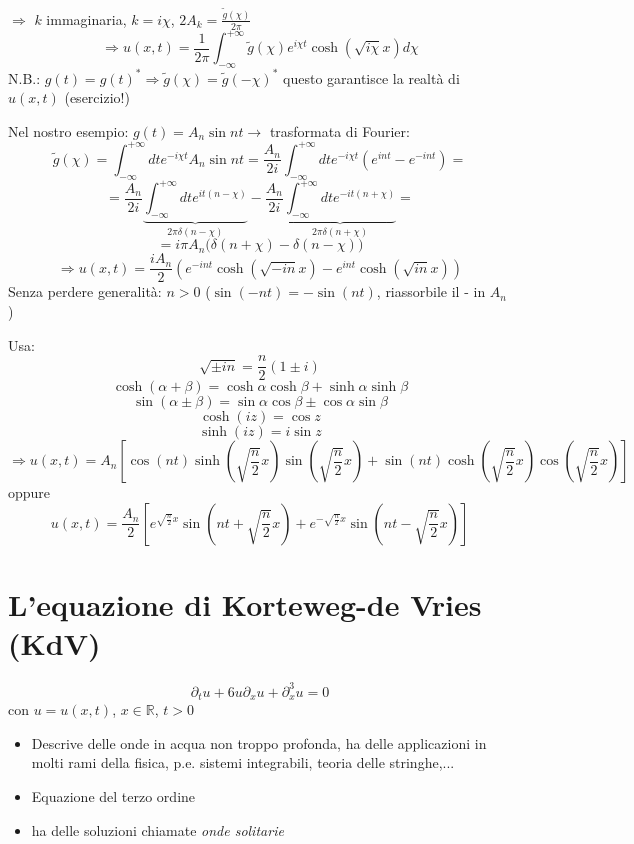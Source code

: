 \documentclass[a4paper,11pt]{report}
\newcommand{\R}{\mathbb{R}}
\begin{document}
$\Rightarrow$ $k$ immaginaria, $k=i\chi$, $2A_k = \frac{\tilde{g}(\chi)}{2\pi}$
\[
\Rightarrow u(x,t) =\frac{1}{2\pi}\int_{-\infty}^{+\infty}\tilde{g}(\chi)e^{i\chi t}\cosh(\sqrt{i\chi}x) d\chi
\]
N.B.: $g(t)=g(t)^* \Rightarrow \tilde{g}(\chi)=\tilde{g}(-\chi)^*$ questo garantisce la realt\`a di $u(x,t)$ (esercizio!)

Nel nostro esempio: $g(t)=A_n\sin nt\rightarrow$ trasformata di Fourier:
\[
\tilde{g}(\chi)=\int_{-\infty}^{+\infty}dt e^{-i\chi t}A_n \sin nt = \frac{A_n}{2i}\int_{-\infty}^{+\infty}dt e^{-i\chi t}\left(e^{int}-e^{-int}\right)=
\]
\[
=\frac{A_n}{2i}\underbrace{\int_{-\infty}^{+\infty} dt e^{it(n-\chi)}}_{2\pi \delta(n-\chi)} -\frac{A_n}{2i}\underbrace{\int_{-\infty}^{+\infty} dt e^{-it(n+\chi)}}_{2\pi \delta(n+\chi)} = 
\]
\[
=i\pi A_n\big(\delta(n+\chi)-\delta(n-\chi)\big)
\]
\[
\Rightarrow u(x,t)=\frac{iA_n}{2}\left(e^{-int}\cosh(\sqrt{-in}x) - e^{int}\cosh(\sqrt{in}x)\right)
\]
Senza perdere generalit\`a: $n>0$ ($\sin(-nt)=-\sin(nt)$, riassorbile il - in $A_n$)

Usa:
\[
\sqrt{\pm in} =\frac{n}{2}(1\pm i)
\]
\[
\cosh(\alpha + \beta)=\cosh \alpha \cosh \beta + \sinh \alpha \sinh \beta
\]
\[
\sin(\alpha \pm \beta)=\sin \alpha \cos \beta \pm \cos \alpha \sin \beta 
\]
\[
\cosh(iz)=\cos z
\]
\[
\sinh(iz)=i\sin z
\]
\[
\Rightarrow u(x,t)=A_n\left[\cos (nt) \sinh \left(\sqrt{\frac{n}{2}}x \right)\sin \left(\sqrt{\frac{n}{2}}x \right) + \sin (nt) \cosh \left(\sqrt{\frac{n}{2}}x \right) \cos \left(\sqrt{\frac{n}{2}}x \right)\right]
\]
oppure
\[
u(x,t)=\frac{A_n}{2}\left[e^{\sqrt{\frac{n}{2}}x}\sin\left(nt+\sqrt{\frac{n}{2}}x\right) + e^{-\sqrt{\frac{n}{2}}x}\sin\left(nt-\sqrt{\frac{n}{2}}x  \right) \right]
\]

\section{L'equazione di Korteweg-de Vries (KdV)}
\begin{equation}
\partial_t u + 6u\partial_xu+\partial^3_x u=0
\label{2.179}
\end{equation}
con $u=u(x,t)$, $x\in \R$, $t>0$
\begin{itemize}
\item Descrive delle onde in acqua non troppo profonda, ha delle applicazioni in molti rami della fisica, p.e. sistemi integrabili, teoria delle stringhe,...
\item Equazione del terzo ordine
\item ha delle soluzioni chiamate \emph{onde solitarie}
\end{itemize}
\end{document}
